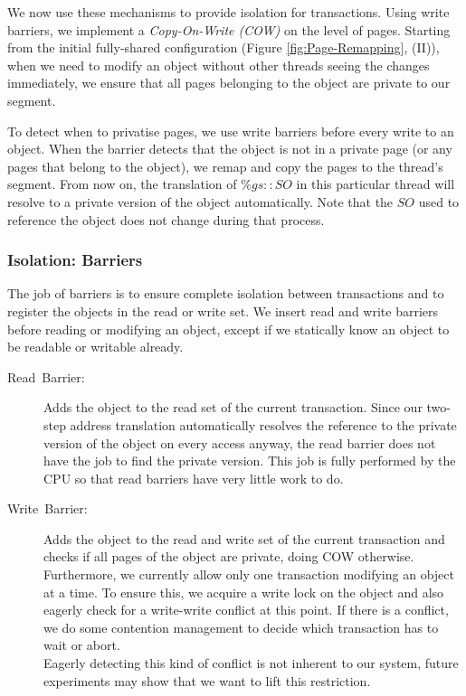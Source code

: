 \documentclass{sigplanconf}
\begin{document}
We now use these mechanisms to provide isolation for transactions.
Using write barriers, we implement a \emph{Copy-On-Write (COW)} on the
level of pages. Starting from the initial fully-shared configuration
(Figure \ref{fig:Page-Remapping}, (II)), when we need to modify an
object without other threads seeing the changes immediately, we ensure
that all pages belonging to the object are private to our segment.

To detect when to privatise pages, we use write barriers before every
write to an object. When the barrier detects that the object is not in
a private page (or any pages that belong to the object), we remap and
copy the pages to the thread's segment. From now on, the translation
of $\%gs{::}SO$ in this particular thread will resolve to a private
version of the object automatically. Note that the $SO$ used to reference
the object does not change during that process.



\subsubsection{Isolation: Barriers}

The job of barriers is to ensure complete isolation between transactions
and to register the objects in the read or write set. We insert read
and write barriers before reading or modifying an object, except if
we statically know an object to be readable or writable already.
\begin{description}
\item [{Read~Barrier:}] Adds the object to the read set of the current
  transaction. Since our two-step address translation automatically
  resolves the reference to the private version of the object on every
  access anyway, the read barrier does not have the job to find the
  private version. This job is fully performed by the CPU so that
  read barriers have very little work to do.
\item [{Write~Barrier:}] Adds the object to the read and write set of
  the current transaction and checks if all pages of the object are
  private, doing COW otherwise.\\
  Furthermore, we currently allow only one transaction modifying an
  object at a time. To ensure this, we acquire a write lock on the object
  and also eagerly check for a write-write conflict at this point. If
  there is a conflict, we do some contention management to decide which
  transaction has to wait or abort.\\
  Eagerly detecting this kind of conflict is not inherent to our
  system, future experiments may show that we want to lift this
  restriction.
\end{description}
\end{document}

